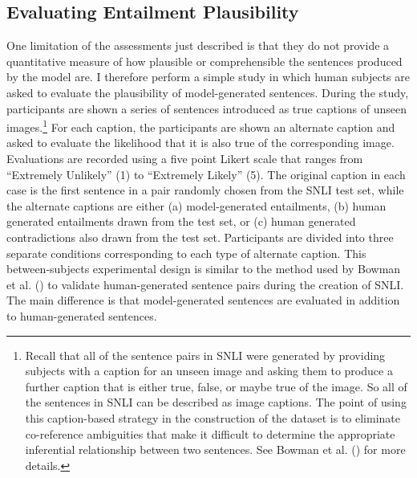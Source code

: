 \subsection{Evaluating Entailment Plausibility}

One limitation of the assessments just described is that they do not provide a quantitative measure of how plausible or comprehensible the sentences produced by the model are. I therefore perform a simple study in which human subjects are asked to evaluate the plausibility of model-generated sentences. During the study, participants are shown a series of sentences introduced as true captions of unseen images.\footnote{Recall that all of the sentence pairs in SNLI were generated by providing subjects with a caption for an unseen image and asking them to produce a further caption that is either true, false, or maybe true of the image. So all of the sentences in SNLI can be described as image captions. The point of using this caption-based strategy in the construction of the dataset is to eliminate co-reference ambiguities that make it difficult to determine the appropriate inferential relationship between two sentences. See Bowman et al. (\citeyear{Bowman:2015}) for more details.} For each caption, the participants are shown an alternate caption and asked to evaluate the likelihood that it is also true of the corresponding image. Evaluations are recorded using a five point Likert scale that ranges from ``Extremely Unlikely'' (1) to ``Extremely Likely'' (5). The original caption in each case is the first sentence in a pair randomly chosen from the SNLI test set, while the alternate captions are either (a) model-generated entailments, (b) human generated entailments drawn from the test set, or (c) human generated contradictions also drawn from the test set. Participants are divided into three separate conditions corresponding to each type of alternate caption. This between-subjects experimental design is similar to the method used by Bowman et al. (\citeyear{Bowman:2015}) to validate human-generated sentence pairs during the creation of SNLI. The main difference is that model-generated sentences are evaluated in addition to human-generated sentences. 

